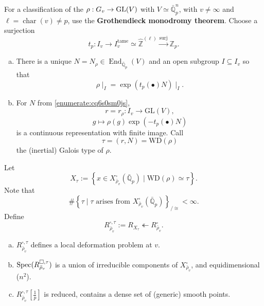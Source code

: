 \documentclass[reqno]{amsart} 
\begin{document}
For a classification of the $\rho : G_v \rightarrow \operatorname{GL}(V)$ with $V \simeq \bar{\mathbb{Q}}_p^n$, with $v \neq \infty$ and $\ell = \operatorname{char}(v) \neq p$, use the \textbf{Grothendieck monodromy theorem}.  Choose a surjection
\begin{equation*}
  t_p : I_v \rightarrow I_v^{\mathrm{tame}} \simeq \hat{\mathbb{Z}}^{(\ell)} \xrightarrow{\text{surj}} \mathbb{Z}_p.
\end{equation*}
\begin{enumerate}[(a)]
\item\label{enumerate:cq6s0sm0js} There is a unique $N = N_\rho \in \operatorname{End}_{\bar{\mathbb{Q}}_p}(V)$ and an open subgroup $I \subseteq I_v$ so that
  \begin{equation*}
    \rho \mid_I = \exp \left(
      t_p(\bullet) N
    \right) \mid_I.
  \end{equation*}
\item\label{enumerate:cq6s0sm7x5} For $N$ from \eqref{enumerate:cq6s0sm0js},
  \begin{equation*}
    r = r_\rho : I_v \rightarrow \mathrm{GL}(V),
  \end{equation*}
  \begin{equation*}
    g \mapsto \rho(g) \exp(- t_p(\bullet) N)
  \end{equation*}
  is a continuous representation with finite image.  Call
  \begin{equation*}
    \tau =(r, N) = \mathrm{W D}(\rho)
  \end{equation*}
  the (inertial) Galois type  of $\rho$.
\end{enumerate}
Let
\begin{equation*}
  X_\tau := \left\{ x \in X_{\bar{\rho}_v}^{\square}(\bar{\mathbb{Q}}_p) \mid \mathrm{WD}(\rho) \simeq \tau \right\}.
\end{equation*}
Note that
\begin{equation*}
  \# \left\{ \tau \mid \tau \text{ arises from } X_{\bar{\rho}_v}^{\square}(\bar{\mathbb{Q}}_p) \right\}_{/ \cong} 
  < \infty.
\end{equation*}
Define
\begin{equation*}
  R_{\bar{\rho}_v}^{\square, \tau} := R_{X_\tau} \twoheadleftarrow R_{\bar{\rho}_v}^{\square}.
\end{equation*}
\begin{theorem}\label{theorem:cq6thpcsuh}
  \begin{enumerate}[(a)]
  \item\label{enumerate:cq6s0szq5l} $R_{\bar{\rho}_v}^{\square, \tau}$ defines a local deformation problem at $v$.
  \item\label{enumerate:cq6s0szrtp} $\operatorname{Spec}(R_{\bar{\rho}_v}^{\square, \tau})$ is a union of irreducible components of $X_{\bar{\rho}_v}^{\square}$, and equidimensional ($n^2$).
  \item\label{enumerate:cq6s0s13y6} $R_{\bar{\rho}_v}^{\square, \tau}[\tfrac{1}{p}]$ is reduced, contains a dense set of (generic) smooth points.
  \end{enumerate}
\end{theorem}
\end{document}
